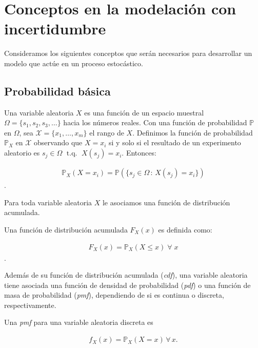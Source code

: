 \section{Conceptos en la modelación con incertidumbre}
\label{sec:incertidumbre}

Consideramos los siguientes conceptos que serán necesarios para desarrollar un modelo que actúe en un proceso estocástico.


\subsection{Probabilidad básica}


\begin{definition}
    Una variable aleatoria $X$ es una función de un espacio muestral $\Omega=\{s_1,s_2,s_3,\dots\}$ hacia los números reales. Con una función de probabilidad $\mathbb{P}$ en $\Omega$, sea $\mathcal{X}=\{x_1,\dots,x_m\}$ el rango de $X$. Definimos la función de probabilidad $\mathbb{P}_X$ en $\mathcal{X}$ observando que $X=x_i$ si y solo si el resultado de un experimento aleatorio es $s_j\in\Omega\;\text{ t.q. }\;X(s_j)=x_i$. Entonces:
    
    \begin{align}
        \mathbb{P}_X(X=x_i) = \mathbb{P}(\{s_j\in\Omega\,:\,X(s_j)=x_i\})
    \end{align}\autocite{:berger2002}.
\end{definition}

Para toda variable aleatoria $X$ le asociamos una función de distribución acumulada.

\begin{definition}
    Una función de distribución acumulada $F_X(x)$ es definida como:

    \begin{align}
        F_X(x)=\mathbb{P}_X(X\leq x)\;\forall\;x
    \end{align}\autocite{:berger2002}.
\end{definition}


Además de su función de distribución acumulada (\textit{cdf}), una variable aleatoria tiene asociada una función de densidad de probabilidad (\textit{pdf}) o una función de masa de probabilidad (\textit{pmf}), dependiendo de si es continua o discreta, respectivamente.

\begin{definition}
    Una \textit{pmf} para una variable aleatoria discreta es

    \begin{align}
        f_X(x)=\mathbb{P}_X(X=x)\,\forall\,x.
    \end{align}
\end{definition}

